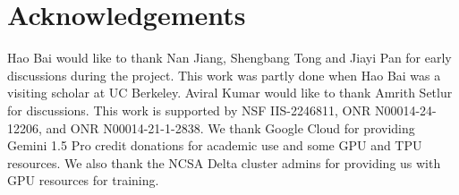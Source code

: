 \section*{Acknowledgements}

Hao Bai would like to thank Nan Jiang, Shengbang Tong and Jiayi Pan for early discussions during the project. This work was partly done when Hao Bai was a visiting scholar at UC Berkeley. Aviral Kumar would like to thank Amrith Setlur for discussions. This work is supported by NSF IIS-2246811, ONR N00014-24-12206, and ONR N00014-21-1-2838. We thank Google Cloud for providing Gemini 1.5 Pro credit donations for academic use and some GPU and TPU resources. We also thank the NCSA Delta cluster admins for providing us with GPU resources for training.
